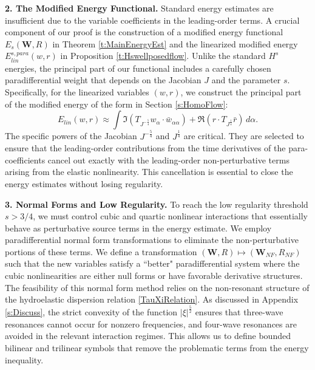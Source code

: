 \documentclass[10pt]{amsart}
\theoremstyle{remark}
\theoremstyle{definition}
\numberwithin{equation}{section}
\newcommand{\al}{\alpha}
\newcommand{\f}{\frac}
\newcommand{\bw}{\mathbf{W}}
\begin{document}
\textbf{2. The Modified Energy Functional.}
Standard energy estimates are insufficient due to the variable coefficients in the leading-order terms. 
A crucial component of our proof is the construction of a modified energy functional $E_s(\bw, R)$ in Theorem \ref{t:MainEnergyEst} and the linearized modified energy $E^{s,para}_{lin}(w,r)$ in Proposition \ref{t:Hswellposedflow}. 
Unlike the standard $H^s$ energies, the principal part of our functional includes a carefully chosen paradifferential weight that depends on the Jacobian $J$ and the parameter $s$.
Specifically, for the linearized variables $(w,r)$, we construct the principal part of the modified energy of the form in Section \ref{s:HomoFlow}:
\begin{equation*} 
    E_{lin}(w,r) \approx \int \Im \left(T_{J^{-\f54}}w_{\al}\cdot \bar{w}_{\al \al} \right) + \Re \left(r\cdot T_{J^{\f14}}\bar{r}\right) \,d\al .
\end{equation*}
The specific powers of the Jacobian $J^{-\f54}$ and $J^{\f14}$ are critical.
They are selected to ensure that the leading-order contributions from the time derivatives of the para-coefficients cancel out exactly with the leading-order non-perturbative terms arising from the elastic nonlinearity. This cancellation is essential to close the energy estimates without losing regularity.

\textbf{3. Normal Forms and Low Regularity.}
To reach the low regularity threshold $s>3/4$, we must control cubic and quartic nonlinear interactions that essentially behave as perturbative source terms in the energy estimate. 
We employ paradifferential normal form transformations to eliminate the non-perturbative portions of these terms. 
We define a transformation $(\bw,R) \mapsto( \bw_{NF}, R_{NF})$ such that the new variables satisfy a ``better" paradifferential system where the cubic nonlinearities are either null forms or have favorable derivative structures.
The feasibility of this normal form method relies on the non-resonant structure of the hydroelastic dispersion relation \eqref{TauXiRelation}.
As discussed in Appendix \ref{s:Discuss}, the strict convexity of the function $|\xi|^\f52$ ensures that three-wave resonances cannot occur for nonzero frequencies, and four-wave resonances are avoided in the relevant interaction regimes. 
This allows us to define bounded bilinear and trilinear symbols that remove the problematic terms from the energy inequality.
\end{document}
